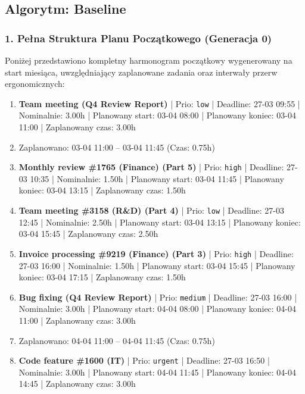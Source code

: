 \vspace{0.8cm}
\subsection{Algorytm: Baseline}

\subsubsection*{1. Pełna Struktura Planu Początkowego (Generacja 0)}
Poniżej przedstawiono kompletny harmonogram początkowy wygenerowany na start miesiąca, uwzględniający zaplanowane zadania oraz interwały przerw ergonomicznych:

{\footnotesize
\begin{enumerate}
  \item [\textbf{14682}] \textbf{Team meeting (Q4 Review Report)} | Prio: \texttt{low} | Deadline: 27-03 09:55 | Nominalnie: 3.00h | Planowany start: 03-04 08:00 | Planowany koniec: 03-04 11:00 | Zaplanowany czas: 3.00h
  \item [\textbf{PRZERWA}] Zaplanowano: 03-04 11:00 -- 03-04 11:45 (Czas: 0.75h)
  \item [\textbf{14627}] \textbf{Monthly review \#1765 (Finance) (Part 5)} | Prio: \texttt{high} | Deadline: 27-03 10:35 | Nominalnie: 1.50h | Planowany start: 03-04 11:45 | Planowany koniec: 03-04 13:15 | Zaplanowany czas: 1.50h
  \item [\textbf{14688}] \textbf{Team meeting \#3158 (R\&D) (Part 4)} | Prio: \texttt{low} | Deadline: 27-03 12:45 | Nominalnie: 2.50h | Planowany start: 03-04 13:15 | Planowany koniec: 03-04 15:45 | Zaplanowany czas: 2.50h
  \item [\textbf{14622}] \textbf{Invoice processing \#9219 (Finance) (Part 3)} | Prio: \texttt{high} | Deadline: 27-03 16:00 | Nominalnie: 1.50h | Planowany start: 03-04 15:45 | Planowany koniec: 03-04 17:15 | Zaplanowany czas: 1.50h
  \item [\textbf{14647}] \textbf{Bug fixing (Q4 Review Report)} | Prio: \texttt{medium} | Deadline: 27-03 16:00 | Nominalnie: 3.00h | Planowany start: 04-04 08:00 | Planowany koniec: 04-04 11:00 | Zaplanowany czas: 3.00h
  \item [\textbf{PRZERWA}] Zaplanowano: 04-04 11:00 -- 04-04 11:45 (Czas: 0.75h)
  \item [\textbf{14605}] \textbf{Code feature \#1600 (IT)} | Prio: \texttt{urgent} | Deadline: 27-03 16:50 | Nominalnie: 3.00h | Planowany start: 04-04 11:45 | Planowany koniec: 04-04 14:45 | Zaplanowany czas: 3.00h

\end{enumerate}}
